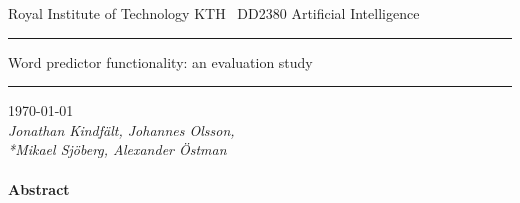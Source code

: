 \begin{titlepage}
\begin{center}
{\Huge \noindent Royal Institute of Technology KTH}
\vspace{15pt}\ 
{\huge \noindent DD2380 Artificial Intelligence}
\vspace{3cm}
\hrule
\vspace{15pt}
{\Huge Word predictor functionality: an evaluation study}
\vspace{15pt}
\hrule
\vspace{1cm}
{\Large\today\\}
\vspace{1em}
{\slshape Jonathan Kindfält, Johannes Olsson,
\\*Mikael Sjöberg, Alexander Östman}
\end{center}
\vspace{1cm}
\paragraph{Abstract}
\lipsum[1]

\end{titlepage}